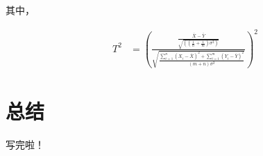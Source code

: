 \documentclass[a4paper,bachelor]{ructhesis}
\theoremstyle{definition}
\theoremstyle{definition}
\theoremstyle{definition}
\theoremstyle{remark}
\begin{document}
其中，

\[
\begin{aligned}
\quad T^2 
&=\left(\frac{\frac{\bar{X}-\bar{Y}}{\sqrt{((\frac{1}{n}+\frac{1}{m})\sigma^2)}}}{{\sqrt{\frac{\sum\limits_{i=1}^n(X_i-\bar{X})^2+\sum\limits_{i=1}^m(Y_i-\bar{Y})^2}{(m+n)\sigma^2}}}}\right)^2
\end{aligned}
\]

\chapter{总结}

写完啦！

\newpage 

\autograph




\nocite{*}

\appendix



\end{document}

